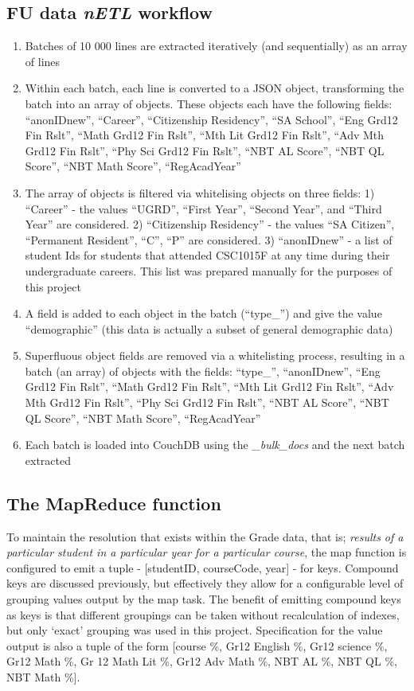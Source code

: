 \subsection*{FU data \textit{nETL} workflow}
\begin{enumerate}
    \item Batches of 10 000 lines are extracted iteratively (and sequentially) as an array of lines
    \item Within each batch, each line is converted to a JSON object, transforming the batch into an array of objects. These objects each have the following fields: ``anonIDnew'', ``Career'', ``Citizenship Residency'', ``SA School'', ``Eng Grd12 Fin Rslt'', ``Math Grd12 Fin Rslt'', ``Mth Lit Grd12 Fin Rslt'', ``Adv Mth Grd12 Fin Rslt'', ``Phy Sci Grd12 Fin Rslt'', ``NBT AL Score'', ``NBT QL Score'', ``NBT Math Score'', ``RegAcadYear''
    \item The array of objects is filtered via whitelising objects on three fields: 1) ``Career'' - the values ``UGRD'', ``First Year'', ``Second Year'', and ``Third Year'' are considered. 2) ``Citizenship Residency'' - the values ``SA Citizen'', ``Permanent Resident'', ``C'', ``P'' are considered. 3) ``anonIDnew'' - a list of student Ids for students that attended CSC1015F at any time during their undergraduate careers. This list was prepared manually for the purposes of this project
    \item A field is added to each object in the batch (``type\_'') and give the value ``demographic'' (this data is actually a subset of general demographic data)
    \item Superfluous object fields are removed via a whitelisting process, resulting in a batch (an array) of objects with the fields: ``type\_'', ``anonIDnew'', ``Eng Grd12 Fin Rslt'', ``Math Grd12 Fin Rslt'', ``Mth Lit Grd12 Fin Rslt'', ``Adv Mth Grd12 Fin Rslt'', ``Phy Sci Grd12 Fin Rslt'', ``NBT AL Score'', ``NBT QL Score'', ``NBT Math Score'', ``RegAcadYear''
    \item Each batch is loaded into CouchDB using the \textit{\_bulk\_docs} and the next batch extracted
\end{enumerate}

\subsection*{The MapReduce function}
To maintain the resolution that exists within the Grade data, that is; \textit{results of a particular student in a particular year for a particular course}, the map function is configured to emit a tuple - [studentID, courseCode, year] - for keys. Compound keys are discussed previously, but effectively they allow for a configurable level of grouping values output by the map task. The benefit of emitting compound keys as keys is that different groupings can be taken without recalculation of indexes, but only `exact' grouping was used in this project. Specification for the value output is also a tuple of the form [course \%, Gr12 English \%, Gr12 science \%, Gr12 Math \%, Gr 12 Math Lit \%, Gr12 Adv Math \%, NBT AL \%, NBT QL \%, NBT Math \%].

